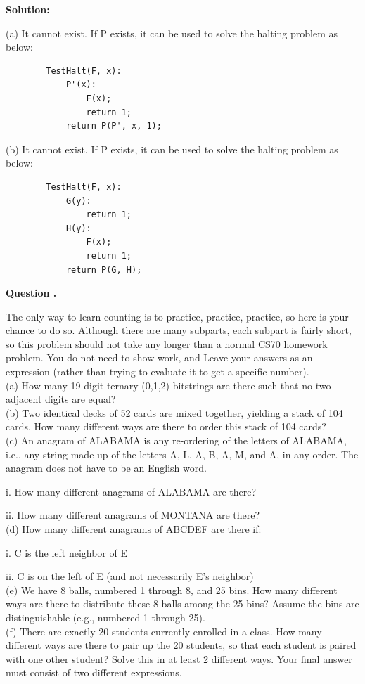 \documentclass[12pt]{article}
\newcounter{questionnumber}
\newenvironment{question}[1][]{\stepcounter{questionnumber}\par\noindent\textbf{Question \thequestionnumber. #1}\par}{\par}
\newenvironment{solution}{\par\noindent\textbf{Solution:}\par}{\par\vspace{1em}}
\begin{document}
\begin{solution}
    \noindent
    (a) It cannot exist. If P exists, it can be used to solve the halting problem as below:
    \begin{lstlisting}
        TestHalt(F, x):
            P'(x):
                F(x);
                return 1;
            return P(P', x, 1);
    \end{lstlisting}
    (b) It cannot exist. If P exists, it can be used to solve the halting problem as below:
    \begin{lstlisting}
        TestHalt(F, x):
            G(y):
                return 1;
            H(y):
                F(x);
                return 1;
            return P(G, H);
    \end{lstlisting}
\end{solution}
\begin{question}
    The only way to learn counting is to practice, practice, practice, so here is your chance to do so. Although there are many subparts, each subpart is fairly short, so this problem should not take any longer than a normal CS70 homework problem. You do not need to show work, and Leave your answers as an expression (rather than trying to evaluate it to get a specific number).\\
    (a) How many 19-digit ternary (0,1,2) bitstrings are there such that no two adjacent digits are equal?\\
    (b) Two identical decks of 52 cards are mixed together, yielding a stack of 104 cards. How many different ways are there to order this stack of 104 cards?\\
    (c) An anagram of ALABAMA is any re-ordering of the letters of ALABAMA, i.e., any string made up of the letters A, L, A, B, A, M, and A, in any order. The anagram does not have to be an English word.

    i. How many different anagrams of ALABAMA are there?

    ii. How many different anagrams of MONTANA are there?\\
    (d) How many different anagrams of ABCDEF are there if:

    i. C is the left neighbor of E

    ii. C is on the left of E (and not necessarily E's neighbor)\\
    (e) We have 8 balls, numbered 1 through 8, and 25 bins. How many different ways are there to distribute these 8 balls among the 25 bins? Assume the bins are distinguishable (e.g., numbered 1 through 25).\\
    (f) There are exactly 20 students currently enrolled in a class. How many different ways are there to pair up the 20 students, so that each student is paired with one other student? Solve this in at least 2 different ways. Your final answer must consist of two different expressions.
\end{question}
\end{document}
